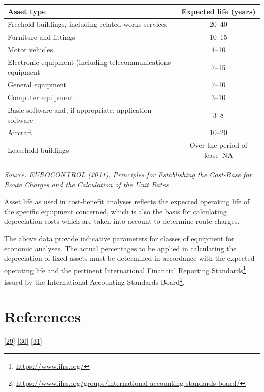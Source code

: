 \documentclass[
  11pt,
  a4paper,
]{book}
\DeclareRobustCommand{\href}[2]{#2\footnote{\url{#1}}}
\begin{document}
\setlength{\LTpost}{0mm}
\begin{longtable}{lc}
\toprule
Asset type & Expected life (years) \\ 
\midrule
Freehold buildings, including related works services & 20–40 \\ 
Furniture and fittings & 10–15 \\ 
Motor vehicles & 4–10 \\ 
Electronic equipment (including telecommunications equipment & 7–15 \\ 
General equipment & 7–10 \\ 
Computer equipment & 3–10 \\ 
Basic software and, if appropriate, application software & 3–8 \\ 
Aircraft & 10–20 \\ 
Leasehold buildings & Over the period of lease–NA \\ 
\bottomrule
\end{longtable}
\begin{minipage}{\linewidth}
\emph{Source: EUROCONTROL (2011), Principles for Establishing the Cost-Base for Route Charges and the Calculation of the Unit Rates}\\
\end{minipage}

Asset life as used in cost-benefit analyses reflects the expected
operating life of the specific equipment concerned, which is also the
basis for calculating depreciation costs which are taken into account to
determine route charges.

The above data provide indicative parameters for classes of equipment
for economic analyses. The actual percentages to be applied in
calculating the depreciation of fixed assets must be determined in
accordance with the expected operating life and the pertinent
\href{https://www.ifrs.org/}{International Financial Reporting
Standards} issued by the
\href{https://www.ifrs.org/groups/international-accounting-standards-board/}{International
Accounting Standards Board}.

\hypertarget{references-13}{%
\section{References}\label{references-13}}

\protect\hyperlink{ref-icao2013}{{[}29{]}}
\protect\hyperlink{ref-ecdgregio2014}{{[}30{]}}
\protect\hyperlink{ref-ecdgregiovademecum2022}{{[}31{]}}
\end{document}
